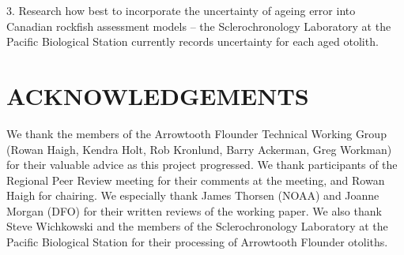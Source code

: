 3. Research how best to incorporate the uncertainty of ageing error into Canadian rockfish assessment models --  the Sclerochronology Laboratory at the Pacific Biological Station currently records uncertainty for each aged otolith.


\section{ACKNOWLEDGEMENTS}

We thank the members of the Arrowtooth Flounder Technical Working Group (Rowan Haigh, Kendra Holt, Rob Kronlund, Barry Ackerman, Greg Workman) for their valuable advice as this project progressed. We thank participants of the Regional Peer Review meeting for their comments at the meeting, and Rowan Haigh for chairing. We especially thank James Thorsen (NOAA) and Joanne Morgan (DFO) for their written reviews of the working paper. We also thank Steve Wichkowski and the members of the Sclerochronology Laboratory at the Pacific Biological Station for their processing of Arrowtooth Flounder otoliths. 






\clearpage



